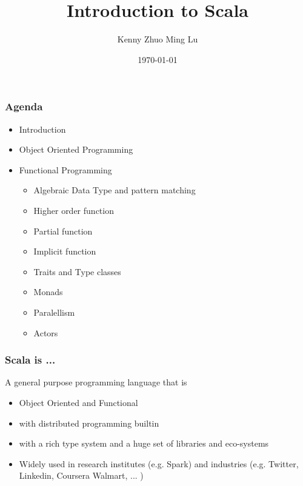 \documentclass{beamer}
\begin{document}
\title{Introduction to Scala} 
\author{
 Kenny Zhuo Ming Lu
}
\date{\today} 


\frame{\titlepage} 

%
\begin{frame}[fragile]
\frametitle{Agenda}
\begin{itemize}
 \item Introduction
 \item Object Oriented Programming 
 \item Functional Programming 
 \begin{itemize}
 \item Algebraic Data Type and pattern matching
 \item Higher order function
 \item Partial function
 \item Implicit function
 \item Traits and Type classes
 \item Monads
 \item Paralellism
 \item Actors
 \end{itemize}
\end{itemize}
\end{frame}

\begin{frame}[fragile]
\frametitle{Scala is ... }

A general purpose programming language that is 
\begin{itemize}
 \item Object Oriented and Functional
 \item with distributed programming builtin
 \item with a rich type system and a huge set of libraries and eco-systems
 \item Widely used in research institutes (e.g. Spark) and industries
   (e.g. Twitter, Linkedin, Coursera Walmart, ... )
\end{itemize}
\end{frame}
\end{document}
